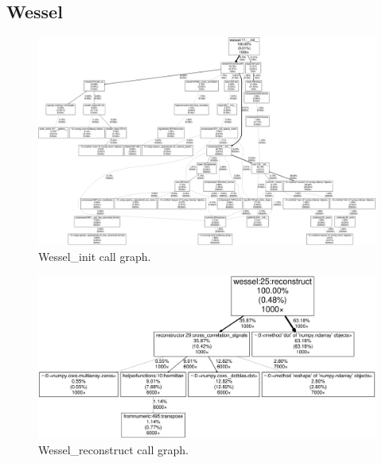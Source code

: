 \documentclass[a4paper, openany, oneside]{memoir}
\begin{document}
\subsection{Wessel}
\label{sub:wessel}

\begin{figure}[H]
    \centering
    \includegraphics[width=0.8\linewidth]{Wessel_init}
    \caption{Wessel\_init call graph.}
    \label{fig:Wessel_init}
\end{figure}

\begin{figure}[H]
    \centering
    \includegraphics[width=0.8\linewidth]{Wessel_reconstruct}
    \caption{Wessel\_reconstruct call graph.}
    \label{fig:Wessel_reconstruct}
\end{figure}
\end{document}
